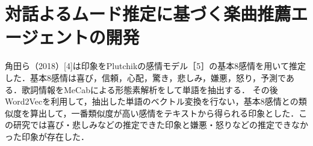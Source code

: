 \section{対話よるムード推定に基づく楽曲推薦エージェントの開発}
角田ら（2018）[4]は印象をPlutchikの感情モデル［5］の基本8感情を用いて推定した．基本8感情は喜び，信頼，心配，驚き，悲しみ，嫌悪，怒り，予測である．歌詞情報をMeCabによる形態素解析をして単語を抽出する．
その後Word2Vecを利用して，抽出した単語のベクトル変換を行ない，基本8感情との類似度を算出して，一番類似度が高い感情をテキストから得られる印象とした．この研究では喜び・悲しみなどの推定できた印象と嫌悪・怒りなどの推定できなかった印象が存在した．